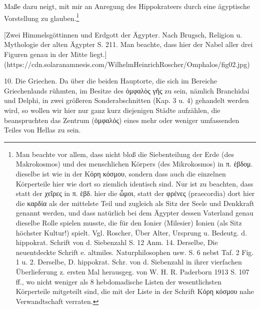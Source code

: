 \documentclass[a4paper, 11pt, oneside]{article}
\begin{document}
Maße dazu neigt, mit mir an Anregung des Hippokrateers durch eine ägyptische Vorstellung zu glauben.\footnote{Man beachte vor allem, dass nicht bloß die Siebenteilung der Erde (des Makrokosmos) und des menschlichen Körpers (des Mikrokosmos) in π. ἑβδομ. dieselbe ist wie in der Κόρη κόσμου, sondern dass auch die einzelnen Körperteile hier wie dort so ziemlich identisch sind. Nur ist zu beachten, dass statt der χεῖρες in π. ἑβδ. hier die ὦμοι, statt der φρένες (praecordia) dort hier die καρδία als der mittelste Teil und zugleich als Sitz der Seele und Denkkraft genannt werden, und dass natürlich bei dem Ägypter dessen Vaterland genau dieselbe Rolle spielen musste, die für den Ionier (Milesier) Ionien (als Sitz höchster Kultur!) spielt. Vgl. Roscher, Über Alter, Ursprung u. Bedeutg. d. hippokrat. Schrift von d. Siebenzahl S. 12 Anm. 14. Derselbe, Die neuentdeckte Schrift e. altmiles. Naturphilosophen usw. S. 6 nebst Taf. 2 Fig. 1 u. 2. Derselbe, D. hippokrat. Schr. von d. Siebenzahl in ihrer vierfachen Überlieferung z. ersten Mal herausgeg. von W. H. R. Paderborn 1913 S. 107 ff., wo nicht weniger als 8 hebdomadische Listen der wesentlichsten Körperteile mitgeteilt sind, die mit der Liste in der Schrift Κόρη κόσμου nahe Verwandtschaft verraten.}

[Zwei Himmelsgöttinnen und Erdgott der Ägypter. Nach Brugsch, Religion u. Mythologie der alten Ägypter S. 211. Man beachte, dass hier der Nabel aller drei Figuren genau in der Mitte liegt.](https://cdn.solaranamnesis.com/WilhelmHeinrichRoscher/Omphalos/fig02.jpg)

10. Die Griechen. Da über die beiden Hauptorte, die sich im Bereiche Griechenlands rühmten, im Besitze des ὀμφαλὸς γῆς zu sein, nämlich Branchidai und Delphi, in zwei größeren Sonderabschnitten (Kap. 3 u. 4) gehandelt werden wird, so wollen wir hier nur ganz kurz diejenigen Städte aufzählen, die beanspruchten das Zentrum (ὀμφαλός) eines mehr oder weniger umfassenden Teiles von Hellas zu sein.
\end{document}
